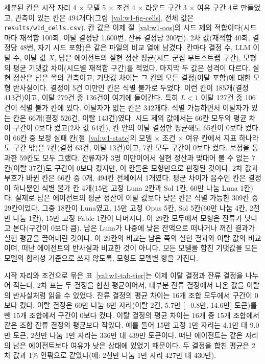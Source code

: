 세분된 칸은 시작 자리 4 $\times$ 모델 5 $\times$ 조건 4 $\times$ 라운드 구간 3 $\times$ 여유 구간 4로 만들었고, 관측이 있는 칸은 494개다(그림~\ref{val:w1-fig-cells}, 전체 값은 \texttt{results/w1d\_cells.csv}). 칸 값은 이제 절~\ref{val:w1-oos}의 시드 제외 적합이다(시드마다 재적합 100회, 이탈 결정당 1,600번, 잔류 결정당 200번). 2차 값(재적합 40회, 결정당 48번, 자기 시드 포함)은 같은 파일의 비교 열에 남겼다. 칸마다 결정 수, LLM 이탈 수, 이탈 값 $X$, 남은 에이전트의 실현 정산 평균(시드 군집 부트스트랩 구간), 모형의 평균 기댓값 차이(시드별 재적합 구간)를 적었다. 마지막 두 값은 성격이 다르다. 실현 정산은 남은 쪽의 관측이고, 기댓값 차이는 그 칸의 모든 결정(이탈 포함)에 대한 모형 반사실이다. 결정이 5건 미만인 칸은 식별 불가로 두었다. 이런 칸이 185개(결정 413건)이고, 이탈 279건 중 136건이 여기에 들어간다. 특히 $L<1$ 이탈 127건 중 106건이 식별 불가 칸에 있다. 이탈자가 없는 칸은 342개다. 식별 가능하면서 이탈자가 있는 칸은 66개(결정 526건, 이탈 143건)였다. 시드 제외 값에서는 66칸 모두의 평균 차이 구간이 0보다 컸고(2차 값 64칸), 칸 안의 이탈 결정만 평균해도 65칸이 0보다 컸다. 이 66칸 중 보정 실패 칸(절~\ref{val:w1-state}의 모델 $\times$ 조건 $\times$ 여유 칸에서 지표 하나라도 구간 밖)은 7칸(결정 63건, 이탈 13건)이고, 7칸 모두 구간이 0보다 컸다. 보정을 통과한 59칸도 모두 그랬다. 잔류자가 3명 미만이어서 실현 정산과 맞대어 볼 수 없는 7칸(이탈 37건)도 구간이 0보다 컸지만, 이 칸들은 모형만으로 판정된 것이다. 2차 값과 부호가 바뀐 칸은 66칸 중 0개, 494칸 전체에서 1개였다. 평균 차이가 음수인 칸은 결정이 하나뿐인 식별 불가 칸 4개(15만 고정 Luna 2칸과 Sol 1칸, 60만 나눔 Luna 1칸)다. 실제로 남은 에이전트의 평균 정산이 이탈 값보다 낮은 칸은 식별 가능한 309칸 중 29칸이었다. 그중 18칸이 Luna였고, 15만 고정 Opus 5칸, Sol 5칸(60만 나눔 4칸, 2천만 나눔 1칸), 15만 고정 Fable 1칸이 나머지다. 이 29칸 모두에서 모형은 잔류가 낫다고 본다(구간이 0보다 큼). 남은 Luna가 나중에 낮은 잔액으로 떠나거나 꺼진 결과가 실현 평균을 끌어내린 것이다. 이 29칸의 비교는 남은 쪽의 실현 결과와 이탈 값의 비교이며, 떠난 에이전트의 반사실과 비교한 것이 아니다. 모든 모델을 합친 기댓값을 모든 모델의 합리성 기준으로 쓰지 않도록, 모형도 모델별 항을 가진다.

시작 자리와 조건으로 묶은 표~\ref{val:w1-tab-tier}는 이제 이탈 결정과 잔류 결정을 나누어 적는다. 2차 표는 두 결정을 합친 평균이어서, 대부분 잔류 결정에서 나온 값을 이탈의 반사실처럼 읽을 수 있었다. 잔류 결정의 평균 차이는 16개 조합 모두에서 구간이 0보다 컸다. 이탈 결정은 60만 나눔 6만 자리(이탈 2건, 5.7만 [$-0.8$만, 14.6만] 토큰)를 뺀 15개 조합에서 구간이 0보다 컸다. 이탈 결정의 평균 차이는 16개 중 15개 조합에서 같은 조합 잔류 결정의 평균보다 작았다. 예를 들어 15만 고정 1만 자리는 4.1만 대 9.0만 토큰, 2천만 나눔 1만 자리는 336만 대 439만 토큰이다. 떠난 에이전트는 같은 자리의 남은 에이전트보다 여유가 낮은 상태에 있었기 때문이다. 두 결정을 합친 평균은 2차 값과 1\% 안팎으로 같았다(예: 2천만 나눔 1만 자리 427만 대 430만).

